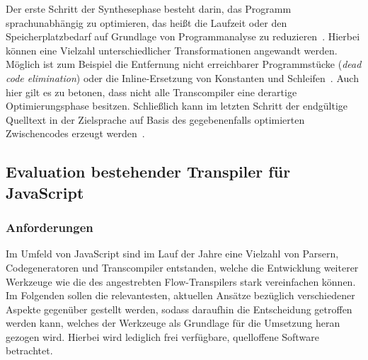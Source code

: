 Der erste Schritt der Synthesephase besteht darin, das Programm sprachunabhängig zu optimieren, das heißt die Laufzeit oder den Speicherplatzbedarf auf Grundlage von Programmanalyse zu reduzieren~\autocite[405]{TORCZON:2007}. Hierbei können eine Vielzahl unterschiedlicher Transformationen angewandt werden. Möglich ist zum Beispiel die Entfernung nicht erreichbarer Programmstücke (\textit{dead code elimination}) oder die Inline-Ersetzung von Konstanten und Schleifen~\autocites{TORCZON:2007}{SCHOEPP:COMPILER}. Auch hier gilt es zu betonen, dass nicht alle Transcompiler eine derartige Optimierungsphase besitzen. Schließlich kann im letzten Schritt der endgültige Quelltext in der Zielsprache auf Basis des gegebenenfalls optimierten Zwischencodes erzeugt werden~\autocite[505]{AHO:COMPILERS}.

\subsection{Evaluation bestehender Transpiler für JavaScript}
\label{subsec:js-transpilers}

\subsubsection{Anforderungen}

Im Umfeld von JavaScript sind im Lauf der Jahre eine Vielzahl von Parsern, Codegeneratoren und Transcompiler entstanden, welche die Entwicklung weiterer Werkzeuge wie die des angestrebten Flow-Transpilers stark vereinfachen können. Im Folgenden sollen die relevantesten, aktuellen Ansätze bezüglich verschiedener Aspekte gegenüber gestellt werden, sodass daraufhin die Entscheidung getroffen werden kann, welches der Werkzeuge als Grundlage für die Umsetzung heran gezogen wird. Hierbei wird lediglich frei verfügbare, quelloffene Software betrachtet.


